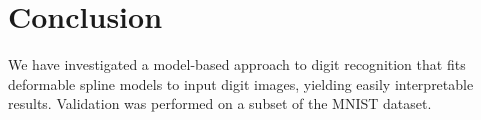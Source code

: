 \documentclass[oribibl]{llncs}
\begin{document}
\section{Conclusion}

We have investigated a model-based approach to digit recognition that fits deformable spline models to input digit images, yielding easily interpretable results.
Validation was performed on a subset of the MNIST dataset.

 

\end{document}
